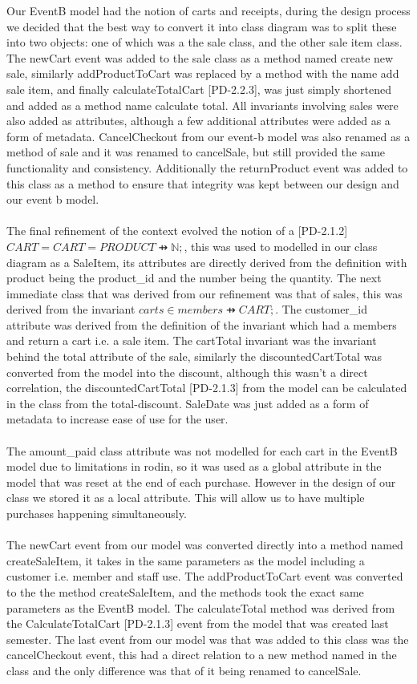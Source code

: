 \documentclass[a4paper]{article}
\begin{document}
Our EventB model had the notion of carts and receipts, during the design process we decided that the best way to convert it into class diagram was to split these into two objects: one of which was a the sale class, and the other sale item class. The newCart event was added to the sale class as a method named create new sale, similarly addProductToCart was replaced by a method with the name add sale item, and finally calculateTotalCart [PD-2.2.3], was just simply shortened and added as a method name calculate total. All invariants involving sales were also added as attributes, although a few additional attributes were added as a form of metadata. CancelCheckout from our event-b model was also renamed as a method of sale and it was renamed to cancelSale, but still provided the same functionality and consistency. Additionally the returnProduct  event was added to this class as a method to ensure that integrity was kept between our design and our event b model.
\\\\
The final refinement of the context evolved the notion of a [PD-2.1.2] \(CART = CART = PRODUCT ⇸ ℕ; \), this was used to modelled in our class diagram as a SaleItem, its attributes are directly derived from the definition with product being the product\_id and the number being the quantity. The next immediate class that was derived from our refinement was that of sales, this was derived from the invariant \(carts ∈ members ⇸ CART; \). The customer\_id attribute was derived from the definition of the invariant which had a members and return a cart i.e. a sale item. The cartTotal invariant  was the invariant behind the total attribute of the sale, similarly the discountedCartTotal  was converted from the model into the discount, although this wasn't a direct correlation, the discountedCartTotal [PD-2.1.3] from the model can be calculated in the class from the total-discount. SaleDate was just added as a form of metadata to increase ease of use  for the user. 
\\\\
The amount\_paid class attribute was not modelled for each cart in the EventB model due to limitations in rodin, so it was used as a global attribute in the model that was reset at the end of each purchase. However in the design of our class we stored it as a local attribute. This will allow us to have multiple purchases happening simultaneously.
\\\\
The newCart event from our model was converted directly into a method named createSaleItem, it takes in the same parameters as the model including a customer i.e. member and staff use. The addProductToCart event was converted to the the method createSaleItem, and the methods took the exact same parameters as the EventB model. The calculateTotal method was derived from the CalculateTotalCart [PD-2.1.3] event from the model that was created last semester.  The last event from our model was that was added to this class was the cancelCheckout event, this had a direct relation to a new method named in the class and the only difference was that of it being renamed to cancelSale.
\end{document}
